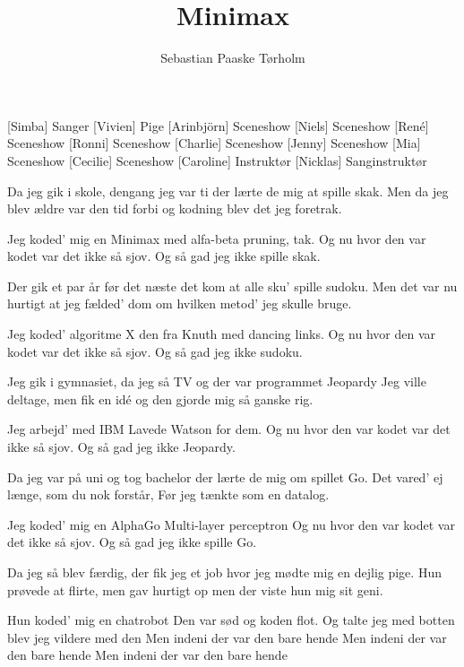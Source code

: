 \documentclass[a4paper,11pt]{article}
\title{Minimax}
\author{Sebastian Paaske Tørholm}
\begin{document}
\maketitle

\begin{roles}
[Simba] Sanger
[Vivien] Pige
[Arinbjörn] Sceneshow
[Niels] Sceneshow
[René] Sceneshow
[Ronni] Sceneshow
[Charlie] Sceneshow
[Jenny] Sceneshow
[Mia] Sceneshow
[Cecilie] Sceneshow
[Caroline] Instruktør
[Nicklas] Sanginstruktør
\end{roles}

\begin{song}
%
Da jeg gik i skole, dengang jeg var ti
der lærte de mig at spille skak.
Men da jeg blev ældre var den tid forbi
og kodning blev det jeg foretrak.

Jeg koded' mig en Minimax
med alfa-beta pruning, tak.
Og nu hvor den var kodet
var det ikke så sjov.
Og så gad jeg ikke spille skak.

Der gik et par år før det næste det kom
at alle sku' spille sudoku.
Men det var nu hurtigt at jeg fælded' dom
om hvilken metod' jeg skulle bruge.

Jeg koded' algoritme X
den fra Knuth med dancing links.
Og nu hvor den var kodet
var det ikke så sjov.
Og så gad jeg ikke sudoku.

Jeg gik i gymnasiet, da jeg så TV
og der var programmet Jeopardy
Jeg ville deltage, men fik en idé
og den gjorde mig så ganske rig.

Jeg arbejd' med IBM
Lavede Watson for dem.
Og nu hvor den var kodet
var det ikke så sjov.
Og så gad jeg ikke Jeopardy.

Da jeg var på uni og tog bachelor
der lærte de mig om spillet Go.
Det vared' ej længe, som du nok forstår,
Før jeg tænkte som en datalog.

Jeg koded' mig en AlphaGo
Multi-layer perceptron
Og nu hvor den var kodet
var det ikke så sjov.
Og så gad jeg ikke spille Go.

Da jeg så blev færdig, der fik jeg et job
hvor jeg mødte mig en dejlig pige.
Hun prøvede at flirte, men gav hurtigt op
men der viste hun mig sit geni.

Hun koded' mig en chatrobot
Den var sød og koden flot.
Og talte jeg med botten
blev jeg vildere med den
Men indeni der var den bare hende
Men indeni der var den bare hende
Men indeni der var den bare hende

\end{song}
\end{document}
